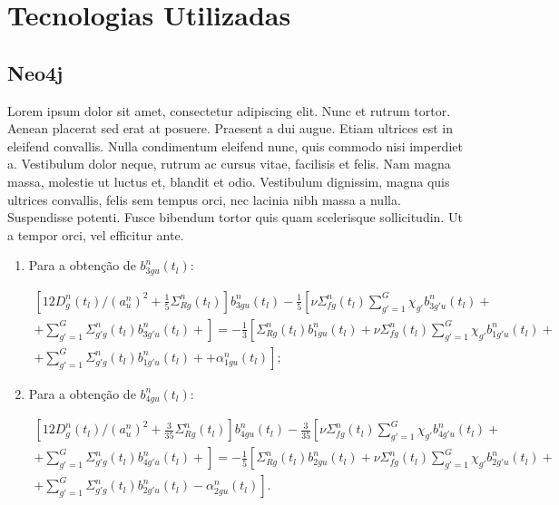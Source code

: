 \chapter{Tecnologias Utilizadas}
\label{chap3}

\section{Neo4j}

Lorem ipsum dolor sit amet, consectetur adipiscing elit. Nunc et rutrum tortor. Aenean placerat sed erat at posuere. Praesent a dui augue. Etiam ultrices est in eleifend convallis. Nulla condimentum eleifend nunc, quis commodo nisi imperdiet a. Vestibulum dolor neque, rutrum ac cursus vitae, facilisis et felis. Nam magna massa, molestie ut luctus et, blandit et odio. Vestibulum dignissim, magna quis ultrices convallis, felis sem tempus orci, nec lacinia nibh massa a nulla. Suspendisse potenti. Fusce bibendum tortor quis quam scelerisque sollicitudin. Ut a tempor orci, vel efficitur ante.

\begin{enumerate}
    \item Para a obtenção de $b_{3gu}^n(t_l)$:
    
    \begin{equation}
    \begin{split}
        \left[12D_g^n(t_l)/(a_u^n)^2 + \frac{1}{5}\Sigma_{Rg}^n(t_l)\right]b_{3gu}^n(t_l) - \frac{1}{5}\left[\nu\Sigma_{fg}^n(t_l)\sum_{g'=1}^G\chi_{g'}b_{3g'u}^n(t_l)\right. + \\
        + \left.\sum_{g'=1}^G \Sigma_{g'g}^n(t_l)b_{3g'u}^n(t_l) + \right] = -\frac{1}{3}\left[\Sigma_{Rg}^n(t_l)b_{1gu}^n(t_l) + \nu\Sigma_{fg}^n(t_l)\sum_{g'=1}^G\chi_{g'}b_{1g'u}^n(t_l)\right. + \\
        \left.+\sum_{g'=1}^G\Sigma_{g'g}^n(t_l)b_{1g'u}^n(t_l)+  +\alpha_{1gu}^n(t_l)\right];
    \label{chap3:58}
    \end{split}
    \end{equation}
    
    \item Para a obtenção de $b_{4gu}^n(t_l)$:
    
    \begin{equation}
    \begin{split}
        \left[12D_g^n(t_l)/(a_u^n)^2 + \frac{3}{35}\Sigma_{Rg}^n(t_l)\right]b_{4gu}^n(t_l) - \frac{3}{35}\left[\nu\Sigma_{fg}^n(t_l)\sum_{g'=1}^G\chi_{g'}b_{4g'u}^n(t_l)\right. + \\
        \left.+ \sum_{g'=1}^G \Sigma_{g'g}^n(t_l)b_{4g'u}^n(t_l) + \right] = -\frac{1}{5}\left[\Sigma_{Rg}^n(t_l)b_{2gu}^n(t_l) + \nu\Sigma_{fg}^n(t_l)\sum_{g'=1}^G\chi_{g'}b_{2g'u}^n(t_l) \right. + \\
        +\left.\sum_{g'=1}^G\Sigma_{g'g}^n(t_l)b_{2g'u}^n(t_l)-\alpha_{2gu}^n(t_l) \right].
    \label{chap3:59}
    \end{split}        
    \end{equation}    
    
    
\end{enumerate}

